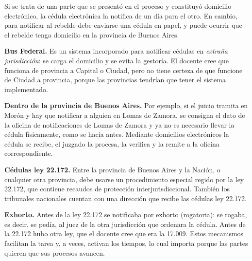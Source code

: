 \documentclass[12pt,oneside]{book}
\begin{document}
Si se trata de una parte que se present\'o en el proceso y constituy\'o domicilio electr\'onico, la c\'edula electr\'onica la notifica de un d\'ia para el otro. En cambio, para notificar al rebelde debe enviarse una c\'edula en papel, y puede ocurrir que el rebelde tenga domicilio en la provincia de Buenos Aires.

\textbf{Bus Federal.} Es un sistema incorporado para notificar c\'edulas en \emph{extra\~na jurisdicci\'on}: se carga el domicilio y se evita la gestor\'ia. El docente cree que funciona de provincia a Capital o Ciudad, pero no tiene certeza de que funcione de Ciudad a provincia, porque las provincias tendr\'ian que tener el sistema implementado.

\textbf{Dentro de la provincia de Buenos Aires.} Por ejemplo, si el juicio tramita en Mor\'on y hay que notificar a alguien en Lomas de Zamora, se consigna el dato de la oficina de notificaciones de Lomas de Zamora y ya no es necesario llevar la c\'edula f\'isicamente, como se hac\'ia antes. Mediante domicilios electr\'onicos la c\'edula se recibe, el juzgado la procesa, la verifica y la remite a la oficina correspondiente.

\textbf{C\'edulas ley 22.172.} Entre la provincia de Buenos Aires y la Naci\'on, o cualquier otra provincia, debe usarse un procedimiento especial regido por la ley 22.172, que contiene recaudos de protecci\'on interjurisdiccional. Tambi\'en los tribunales nacionales cuentan con una direcci\'on que recibe las c\'edulas ley 22.172.

\textbf{Exhorto.} Antes de la ley 22.172 se notificaba por exhorto (rogatoria): se rogaba, es decir, se ped\'ia, al juez de la otra jurisdicci\'on que ordenara la c\'edula. Antes de la 22.172 hubo otra ley, que el docente cree que era la 17.009. Estos mecanismos facilitan la tarea y, a veces, activan los tiempos, lo cual importa porque las partes quieren que sus procesos avancen.
\end{document}
